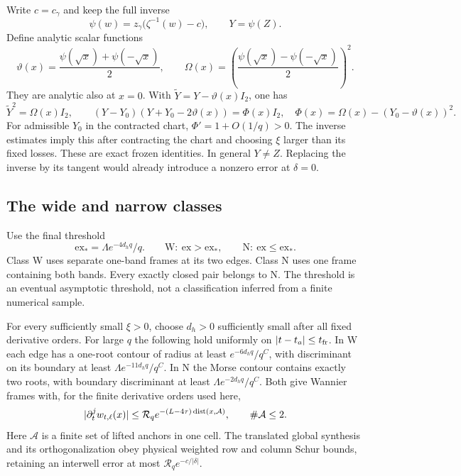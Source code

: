Write $c=c_\gamma$ and keep the full inverse
\[
 \psi(w)=z_\gamma\bigl(\zeta^{-1}(w)-c\bigr),\qquad Y=\psi(Z).
\]
Define analytic scalar functions
\begin{equation}\label{eq:libinverse}
 \vartheta(x)=\frac{\psi(\sqrt x)+\psi(-\sqrt x)}2,\qquad
 \Omega(x)=\left(\frac{\psi(\sqrt x)-\psi(-\sqrt x)}2\right)^2.
\end{equation}
They are analytic also at $x=0$. With
$\widetilde Y=Y-\vartheta(x)I_2$, one has
\begin{equation}\label{eq:libfactor}
 \widetilde Y^2=\Omega(x)I_2,\qquad
 (Y-Y_0)(Y+Y_0-2\vartheta(x))=\Phi(x)I_2,
 \quad \Phi(x)=\Omega(x)-(Y_0-\vartheta(x))^2.
\end{equation}
For admissible $Y_0$ in the contracted chart,
$\Phi'=1+O(1/q)>0$. The inverse estimates imply this after contracting
the chart and choosing $\xi$ larger than its fixed losses.
These are exact frozen identities. In general $Y\ne Z$.
Replacing the inverse by its tangent would already introduce a
nonzero error at $\delta=0$.

\subsection{The wide and narrow classes}

Use the final threshold
\begin{equation}\label{eq:libclasses}
 \mathrm{ex}_*=\Lambda e^{-4d_hq}/q.
 \qquad \mathrm W:\ \mathrm{ex}>\mathrm{ex}_*,\qquad
 \mathrm N:\ \mathrm{ex}\le\mathrm{ex}_*.
\end{equation}
Class W uses separate one-band frames at its two edges. Class N
uses one frame containing both bands. Every exactly closed pair
belongs to N. The threshold is an eventual asymptotic threshold,
not a classification inferred from a finite numerical sample.

\begin{lemma}\label{lem:libframes}
For every sufficiently small $\xi>0$, choose $d_h>0$ sufficiently
small after all fixed derivative orders. For large $q$ the following
hold uniformly on $|t-t_a|\le t_{\rm fr}$.
In W each edge has a one-root contour of radius at least
$e^{-6d_hq}/q^C$, with discriminant on its boundary at least
$\Lambda e^{-11d_hq}/q^C$.
In N the Morse contour contains exactly two roots, with boundary
discriminant at least $\Lambda e^{-2d_hq}/q^C$.
Both give Wannier frames with, for the finite derivative orders used
here,
\begin{equation}\label{eq:libtails}
 |\partial_t^j w_{t,\ell}(x)|\le
 \mathcal R_q e^{-(L-4\tau)\operatorname{dist}(x,\mathcal A)},
 \qquad \#\mathcal A\le2.
\end{equation}
Here $\mathcal A$ is a finite set of lifted anchors in one cell.
The translated global synthesis and its orthogonalization obey
physical weighted row and column Schur bounds, retaining an
interwell error at most $\mathcal R_q e^{-c/|\delta|}$.
\end{lemma}

